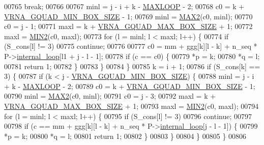 \begin{DoxyCode}
00765       \textcolor{keywordflow}{break};
00766 
00767     minl  = j - i + k - \mbox{\hyperlink{energy__const_8h_ad1bd6eabac419670ddd3c9ed82145988}{MAXLOOP}} - 2;
00768     c0    = k + \mbox{\hyperlink{group__energy__parameters_gad7bdd880afca461f97763d79ee57a347}{VRNA\_GQUAD\_MIN\_BOX\_SIZE}} - 1;
00769     minl  = \mbox{\hyperlink{group__utils_ga33297b3679c713b0c4d897cd0fe3b122}{MAX2}}(c0, minl);
00770     c0    = j - 1;
00771     maxl  = k + \mbox{\hyperlink{group__energy__parameters_ga56cafabad2f8a7db83f2d5d3b0e8d313}{VRNA\_GQUAD\_MAX\_BOX\_SIZE}} + 1;
00772     maxl  = \mbox{\hyperlink{group__utils_gae0b9cd0ce090bd69b951aa73e8fa4f7d}{MIN2}}(c0, maxl);
00773     \textcolor{keywordflow}{for} (l = minl; l < maxl; l++) \{
00774       \textcolor{keywordflow}{if} (S\_cons[l] != 3)
00775         \textcolor{keywordflow}{continue};
00776 
00777       c0 = mm + ggg[k][l - k] + n\_seq * P->\mbox{\hyperlink{group__energy__parameters_a2a4fb2c65023ec371c9b96573da6d2fc}{internal\_loop}}[l1 + j - l - 1];
00778       \textcolor{keywordflow}{if} (c == c0) \{
00779         *p  = k;
00780         *q  = l;
00781         \textcolor{keywordflow}{return} 1;
00782       \}
00783     \}
00784   \}
00785   k = i + 1;
00786   \textcolor{keywordflow}{if} (S\_cons[k] == 3) \{
00787     \textcolor{keywordflow}{if} (k < j - \mbox{\hyperlink{group__energy__parameters_gad7bdd880afca461f97763d79ee57a347}{VRNA\_GQUAD\_MIN\_BOX\_SIZE}}) \{
00788       minl  = j - i + k - \mbox{\hyperlink{energy__const_8h_ad1bd6eabac419670ddd3c9ed82145988}{MAXLOOP}} - 2;
00789       c0    = k + \mbox{\hyperlink{group__energy__parameters_gad7bdd880afca461f97763d79ee57a347}{VRNA\_GQUAD\_MIN\_BOX\_SIZE}} - 1;
00790       minl  = \mbox{\hyperlink{group__utils_ga33297b3679c713b0c4d897cd0fe3b122}{MAX2}}(c0, minl);
00791       c0    = j - 3;
00792       maxl  = k + \mbox{\hyperlink{group__energy__parameters_ga56cafabad2f8a7db83f2d5d3b0e8d313}{VRNA\_GQUAD\_MAX\_BOX\_SIZE}} + 1;
00793       maxl  = \mbox{\hyperlink{group__utils_gae0b9cd0ce090bd69b951aa73e8fa4f7d}{MIN2}}(c0, maxl);
00794       \textcolor{keywordflow}{for} (l = minl; l < maxl; l++) \{
00795         \textcolor{keywordflow}{if} (S\_cons[l] != 3)
00796           \textcolor{keywordflow}{continue};
00797 
00798         \textcolor{keywordflow}{if} (c == mm + ggg[k][l - k] + n\_seq * P->\mbox{\hyperlink{group__energy__parameters_a2a4fb2c65023ec371c9b96573da6d2fc}{internal\_loop}}[j - l - 1]) \{
00799           *p  = k;
00800           *q  = l;
00801           \textcolor{keywordflow}{return} 1;
00802         \}
00803       \}
00804     \}
00805   \}
00806 

\end{DoxyCode}
